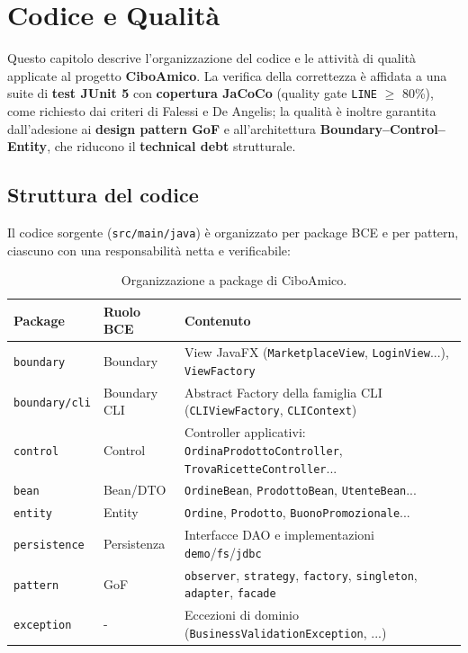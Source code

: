 \chapter{Codice e Qualità}
\label{cap:qualita}

Questo capitolo descrive l'organizzazione del codice e le attività di qualità
applicate al progetto \textbf{CiboAmico}. La verifica della correttezza è
affidata a una suite di \textbf{test JUnit 5} con \textbf{copertura JaCoCo}
(quality gate \texttt{LINE} $\geq$ 80\%), come richiesto dai criteri di Falessi
e De Angelis; la qualità è inoltre garantita dall'adesione ai \textbf{design
pattern GoF} e all'architettura \textbf{Boundary--Control--Entity}, che
riducono il \textbf{technical debt} strutturale.

\section{Struttura del codice}
\label{sec:qualita_struttura}

Il codice sorgente (\texttt{src/main/java}) è organizzato per package BCE e per
pattern, ciascuno con una responsabilità netta e verificabile:

\begin{table}[H]
    \centering
    \small
    \begin{tabular}{@{}llp{9cm}@{}}
        \toprule
        \textbf{Package} & \textbf{Ruolo BCE} & \textbf{Contenuto} \\ \midrule
        \texttt{boundary} & Boundary & View JavaFX (\texttt{MarketplaceView}, \texttt{LoginView}...), \texttt{ViewFactory} \\
        \texttt{boundary/cli} & Boundary CLI & Abstract Factory della famiglia CLI (\texttt{CLIViewFactory}, \texttt{CLIContext}) \\
        \texttt{control} & Control & Controller applicativi: \texttt{OrdinaProdottoController}, \texttt{TrovaRicetteController}... \\
        \texttt{bean} & Bean/DTO & \texttt{OrdineBean}, \texttt{ProdottoBean}, \texttt{UtenteBean}... \\
        \texttt{entity} & Entity & \texttt{Ordine}, \texttt{Prodotto}, \texttt{BuonoPromozionale}... \\
        \texttt{persistence} & Persistenza & Interfacce DAO e implementazioni \texttt{demo}/\texttt{fs}/\texttt{jdbc} \\
        \texttt{pattern} & GoF & \texttt{observer}, \texttt{strategy}, \texttt{factory}, \texttt{singleton}, \texttt{adapter}, \texttt{facade} \\
        \texttt{exception} & - & Eccezioni di dominio (\texttt{BusinessValidationException}, ...) \\
        \bottomrule
    \end{tabular}
    \caption{Organizzazione a package di CiboAmico.}
    \label{tab:struttura}
\end{table}

